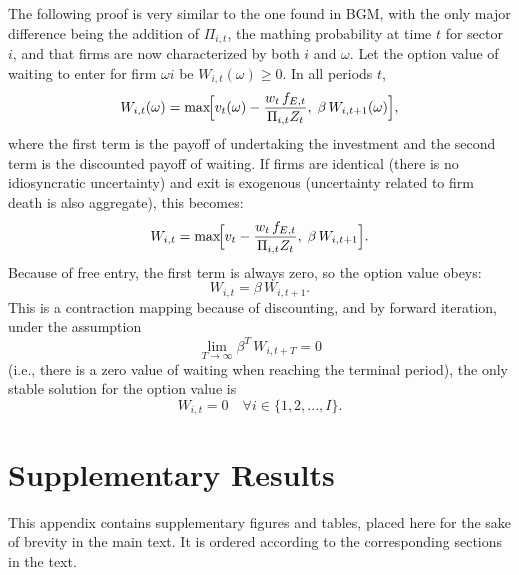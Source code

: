 \documentclass[a4paper,12pt]{article} %
\numberwithin{equation}{section} %
\numberwithin{figure}{section}
\numberwithin{table}{section}
\begin{document}
\begin{refsection}
\begin{appendices}
The following proof is very similar to the one found in BGM, with the only major difference being the addition of $\Pi_{i,t}$,
the mathing probability at time $t$ for sector $i$, and that firms are now characterized by both $i$ and $\omega$.
Let the option value of waiting to enter for firm $\omega i$ be $W_{i,t}(\omega)\ge0$. In all periods $t$,
\[
W_{i,t}(\omega)
=\max\!\Bigl[v_t(\omega)-\frac{w_t\,f_{E,t}}{\Pi_{i,t}Z_t},\;\beta\,W_{i,t+1}(\omega)\Bigr],
\]
where the first term is the payoff of undertaking the investment and the second term is the discounted payoff of waiting. 
If firms are identical (there is no idiosyncratic uncertainty) and exit is exogenous (uncertainty related to firm death is also aggregate), this becomes:
\[
W_{i,t}
=\max\!\Bigl[v_t-\frac{w_t\,f_{E,t}}{\Pi_{i,t}Z_t},\;\beta\,W_{i,t+1}\Bigr].
\]
Because of free entry, the first term is always zero, so the option value obeys:
\[
W_{i,t} = \beta\,W_{i,t+1}.
\]
This is a contraction mapping because of discounting, and by forward iteration, under the assumption
\[
\lim_{T\to\infty}\beta^T\,W_{i,t+T}=0
\]
(i.e., there is a zero value of waiting when reaching the terminal period), the only stable solution for the option value is
\[
W_{i,t} = 0 \quad \forall i \in \{1,2,...,I\}.
\]

\pagebreak
\section{Supplementary Results}
\label{sec-app:sup}

This appendix contains supplementary figures and tables, placed here for the sake of brevity in the main text. It is ordered according to the corresponding sections in the text.



\newpage
\end{appendices}
\thispagestyle{plain}
\renewcommand*{\thepage}{A-\Roman{page}} %

\printbibliography[heading=subbibliography, title={Appendix References}]
\thispagestyle{plain}
\cleardoublepage %

\end{refsection}
\end{document}
